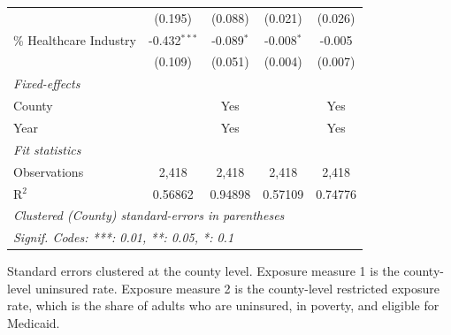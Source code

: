 \begin{tabular}{lcccc}
                           & (0.195)            & (0.088)       & (0.021)            & (0.026)\\   
   \% Healthcare Industry  & -0.432$^{***}$     & -0.089$^{*}$  & -0.008$^{*}$       & -0.005\\   
                           & (0.109)            & (0.051)       & (0.004)            & (0.007)\\   
   \midrule
   \emph{Fixed-effects}\\
   County                  &                    & Yes           &                    & Yes\\  
   Year                    &                    & Yes           &                    & Yes\\  
   \midrule
   \emph{Fit statistics}\\
   Observations            & 2,418              & 2,418         & 2,418              & 2,418\\  
   R$^2$                   & 0.56862            & 0.94898       & 0.57109            & 0.74776\\  
   \midrule \midrule
   \multicolumn{5}{l}{\emph{Clustered (County) standard-errors in parentheses}}\\
   \multicolumn{5}{l}{\emph{Signif. Codes: ***: 0.01, **: 0.05, *: 0.1}}\\
\end{tabular}
 
\par \raggedright 
Standard errors clustered at the county level. Exposure measure 1 is the county-level uninsured rate. Exposure measure 2 is the county-level restricted exposure rate, which is the share of adults who are uninsured, in poverty, and eligible for Medicaid.
\par\endgroup


